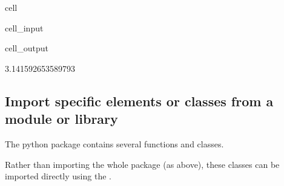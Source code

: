 \documentclass[letterpaper,10pt,english]{jupyterBook}
\begin{document}
\begin{sphinxuseclass}{cell}\begin{sphinxVerbatimInput}

\begin{sphinxuseclass}{cell_input}
\begin{sphinxVerbatim}[commandchars=\\\{\}]
 


\end{sphinxVerbatim}

\end{sphinxuseclass}\end{sphinxVerbatimInput}
\begin{sphinxVerbatimOutput}

\begin{sphinxuseclass}{cell_output}
\begin{sphinxVerbatim}[commandchars=\\\{\}]
3.141592653589793
\end{sphinxVerbatim}

\end{sphinxuseclass}\end{sphinxVerbatimOutput}

\end{sphinxuseclass}

\subsection{Import specific elements or classes from a module or library}
\label{\detokenize{content/04_PythonEssentials/PythonPandasDataframes:import-specific-elements-or-classes-from-a-module-or-library}}
\sphinxAtStartPar
The python package  contains several functions and classes.

\sphinxAtStartPar
Rather than importing the whole package (as above), these classes can be imported directly using the .
\end{document}

